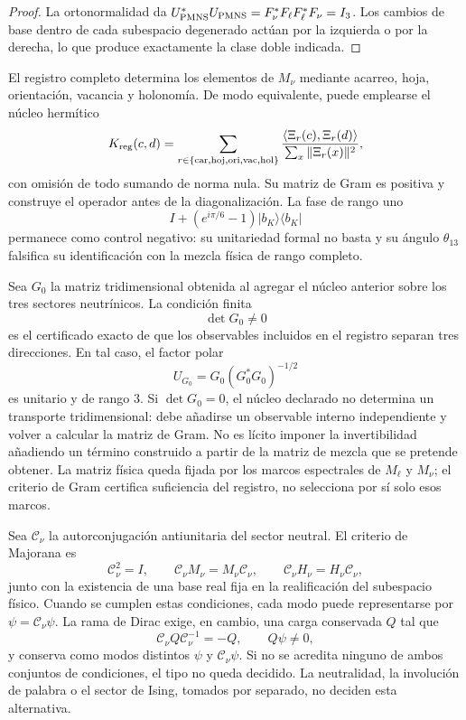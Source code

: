 \begin{proof}
La ortonormalidad da
\(U_{\rm PMNS}^*U_{\rm PMNS}=F_\nu^*F_\ell F_\ell^*F_\nu=I_3\).
Los cambios de base dentro de cada subespacio degenerado actúan por la
izquierda o por la derecha, lo que produce exactamente la clase doble
indicada.
\end{proof}

El registro completo determina los elementos de \(M_\nu\) mediante acarreo,
hoja, orientación, vacancia y holonomía. De modo equivalente, puede emplearse
el núcleo hermítico
\[
 K_{\rm reg}(c,d)
 =\sum_{r\in\{\rm car,hoj,ori,vac,hol\}}
 \frac{\langle\Xi_r(c),\Xi_r(d)\rangle}
      {\sum_x\|\Xi_r(x)\|^2},
\]
con omisión de todo sumando de norma nula. Su matriz de Gram es positiva y
construye el operador antes de la diagonalización. La fase de rango uno
\[
 I+(e^{i\pi/6}-1)|b_K\rangle\langle b_K|
\]
permanece como control negativo: su unitariedad formal no basta y su ángulo
\(\theta_{13}\) falsifica su identificación con la mezcla física de rango
completo.

Sea \(G_0\) la matriz tridimensional obtenida al agregar el núcleo anterior
sobre los tres sectores neutrínicos. La condición finita
\[
 \det G_0\ne0
\]
es el certificado exacto de que los observables incluidos en el registro
separan tres direcciones. En tal caso, el factor polar
\[
 U_{G_0}=G_0(G_0^*G_0)^{-1/2}
\]
es unitario y de rango \(3\). Si \(\det G_0=0\), el núcleo declarado no
determina un transporte tridimensional: debe añadirse un observable interno
independiente y volver a calcular la matriz de Gram. No es lícito imponer la
invertibilidad añadiendo un término construido a partir de la matriz de mezcla
que se pretende obtener. La matriz física queda fijada por los marcos
espectrales de \(M_\ell\) y \(M_\nu\); el criterio de Gram certifica suficiencia
del registro, no selecciona por sí solo esos marcos.

Sea \(\mathcal C_\nu\) la autorconjugación antiunitaria del sector neutral. El
criterio de Majorana es
\[
 \mathcal C_\nu^2=I,
 \qquad
 \mathcal C_\nu M_\nu=M_\nu\mathcal C_\nu,
 \qquad
 \mathcal C_\nu H_\nu=H_\nu\mathcal C_\nu,
\]
junto con la existencia de una base real fija en la realificación del
subespacio físico. Cuando se cumplen estas condiciones, cada modo puede
representarse por \(\psi=\mathcal C_\nu\psi\). La rama de Dirac exige, en
cambio, una carga conservada \(Q\) tal que
\[
 \mathcal C_\nu Q\mathcal C_\nu^{-1}=-Q,
 \qquad Q\psi\ne0,
\]
y conserva como modos distintos \(\psi\) y \(\mathcal C_\nu\psi\). Si no se
acredita ninguno de ambos conjuntos de condiciones, el tipo no queda decidido.
La neutralidad, la involución de palabra o el sector de Ising, tomados por
separado, no deciden esta alternativa.

